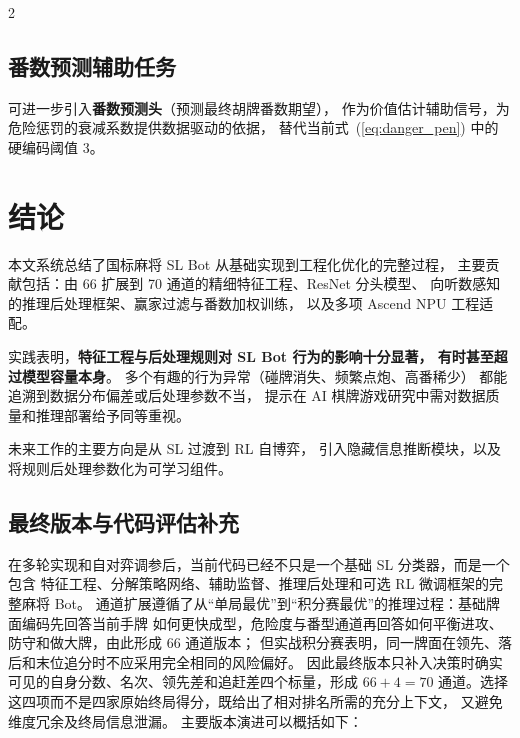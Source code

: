 \documentclass{article}
\begin{document}
\begin{multicols}{2}
\subsection{番数预测辅助任务}

可进一步引入\textbf{番数预测头}（预测最终胡牌番数期望），
作为价值估计辅助信号，为危险惩罚的衰减系数提供数据驱动的依据，
替代当前式~(\ref{eq:danger_pen}) 中的硬编码阈值 3。

\section{结论}
\label{sec:conclusion}

本文系统总结了国标麻将 SL Bot 从基础实现到工程化优化的完整过程，
主要贡献包括：由 66 扩展到 70 通道的精细特征工程、ResNet 分头模型、
向听数感知的推理后处理框架、赢家过滤与番数加权训练，
以及多项 Ascend NPU 工程适配。

实践表明，\textbf{特征工程与后处理规则对 SL Bot 行为的影响十分显著，
有时甚至超过模型容量本身}。
多个有趣的行为异常（碰牌消失、频繁点炮、高番稀少）
都能追溯到数据分布偏差或后处理参数不当，
提示在 AI 棋牌游戏研究中需对数据质量和推理部署给予同等重视。

未来工作的主要方向是从 SL 过渡到 RL 自博弈，
引入隐藏信息推断模块，以及将规则后处理参数化为可学习组件。

\subsection{最终版本与代码评估补充}

在多轮实现和自对弈调参后，当前代码已经不只是一个基础 SL 分类器，而是一个包含
特征工程、分解策略网络、辅助监督、推理后处理和可选 RL 微调框架的完整麻将 Bot。
通道扩展遵循了从“单局最优”到“积分赛最优”的推理过程：基础牌面编码先回答当前手牌
如何更快成型，危险度与番型通道再回答如何平衡进攻、防守和做大牌，由此形成 66 通道版本；
但实战积分赛表明，同一牌面在领先、落后和末位追分时不应采用完全相同的风险偏好。
因此最终版本只补入决策时确实可见的自身分数、名次、领先差和追赶差四个标量，形成
$66+4=70$ 通道。选择这四项而不是四家原始终局得分，既给出了相对排名所需的充分上下文，
又避免维度冗余及终局信息泄漏。
主要版本演进可以概括如下：


\end{multicols}
\end{document}
